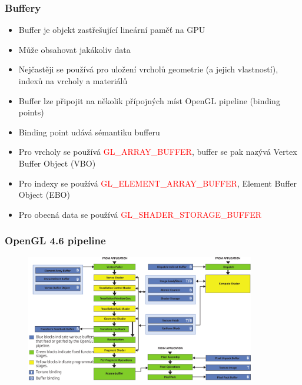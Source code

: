
\begin{frame}
\frametitle{Buffery}
  \begin{itemize}
  \item Buffer je objekt zastřešující lineární paměť na GPU
  \item Může obsahovat jakákoliv data
  \item Nejčastěji se používá pro uložení vrcholů geometrie (a jejich vlastností), indexů na vrcholy a materiálů
  \item Buffer lze připojit na několik přípojných míst OpenGL pipeline (binding points)
  \item Binding point udává sémantiku bufferu
  \item Pro vrcholy se používá \textcolor{red}{GL\_ARRAY\_BUFFER}, buffer se pak nazývá Vertex Buffer Object (VBO)
  \item Pro indexy se používá \textcolor{red}{GL\_ELEMENT\_ARRAY\_BUFFER}, Element Buffer Object (EBO)
  \item Pro obecná data se používá \textcolor{red}{GL\_SHADER\_STORAGE\_BUFFER}
  \end{itemize}
\end{frame}

\begin{frame}
\frametitle{OpenGL 4.6 pipeline}
  \begin{figure}[h]
  \includegraphics[width=10cm,keepaspectratio]{pics/pipeline/OpenGL460Pipeline}
  \end{figure}
\end{frame}


